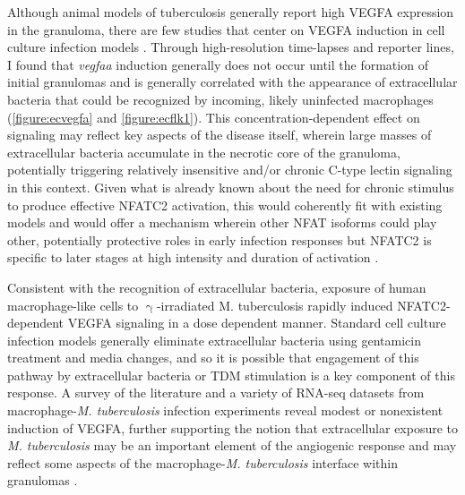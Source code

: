 Although animal models of tuberculosis generally report high VEGFA expression in the granuloma, there are few studies that center on VEGFA induction in cell culture infection models \citep{Polena2016}. Through high\hyp{}resolution time\hyp{}lapses and reporter lines, I found that \textit{vegfaa} induction generally does not occur until the formation of initial granulomas and is generally correlated with the appearance of extracellular bacteria that could be recognized by incoming, likely uninfected macrophages (\autoref{figure:ecvegfa} and \autoref{figure:ecflk1}). This concentration\hyp{}dependent effect on signaling may reflect key aspects of the disease itself, wherein large masses of extracellular bacteria accumulate in the necrotic core of the granuloma, potentially triggering relatively insensitive and/or chronic C\hyp{}type lectin signaling in this context. Given what is already known about the need for chronic stimulus to produce effective NFATC2 activation, this would coherently fit with existing models and would offer a mechanism wherein other NFAT isoforms could play other, potentially protective roles in early infection responses but NFATC2 is specific to later stages at high intensity and duration of activation \citep{Yissachar2013, Kar2015}. 

Consistent with the recognition of extracellular bacteria, exposure of human macrophage\hyp{}like cells to $\upgamma$\hyp{}irradiated M. tuberculosis rapidly induced NFATC2\hyp{}dependent VEGFA signaling in a dose dependent manner. Standard cell culture infection models generally eliminate extracellular bacteria using gentamicin treatment and media changes, and so it is possible that engagement of this pathway by extracellular bacteria or TDM stimulation is a key component of this response. A survey of the literature and a variety \citep{Lee2019, Pisu2020, Hall2021, Looney2021, Pu2021} of RNA\hyp{}seq datasets from macrophage\hyp{}\textit{M. tuberculosis} infection experiments reveal modest or nonexistent induction of VEGFA, further supporting the notion that extracellular exposure to \textit{M. tuberculosis} may be an important element of the angiogenic response and may reflect some aspects of the macrophage\hyp{}\textit{M. tuberculosis} interface within granulomas \citep{Orme2014b}.

